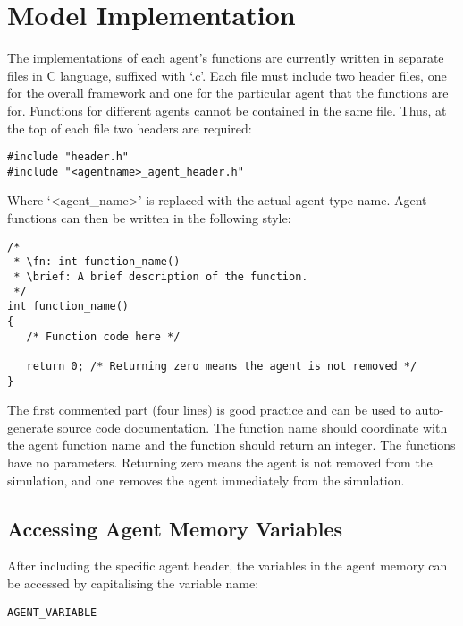 \section{Model Implementation}
\label{model_implementation}

The implementations of each agent's functions are currently written in separate
files in C language, suffixed with `.c'. Each file must include two
header files, one for the overall framework and one for the particular agent that the functions are for.
Functions for different agents cannot be contained in the same file.
Thus, at the top of each file two headers are required:

\begin{mylisting}
\begin{verbatim}
#include "header.h"
#include "<agentname>_agent_header.h"
\end{verbatim}
\end{mylisting}

Where `<agent\_name>' is replaced with the actual agent type name.
Agent functions can then be written in the following style:

\begin{mylisting}
\begin{verbatim}
/*
 * \fn: int function_name()
 * \brief: A brief description of the function.
 */
int function_name()
{
   /* Function code here */

   return 0; /* Returning zero means the agent is not removed */
}
\end{verbatim}
\end{mylisting}

The first commented part (four lines) is good practice and can be used to
auto-generate source code documentation. The function name should coordinate
with the agent function name and the function should return an integer. The
functions have no parameters. Returning zero means the agent is not removed from
the simulation, and one removes the agent immediately from the simulation.

\subsection{Accessing Agent Memory Variables}

After including the specific agent header, the variables in the
agent memory can be accessed by capitalising the variable name:

\begin{mylisting}
\begin{verbatim}
AGENT_VARIABLE
\end{verbatim}
\end{mylisting}

